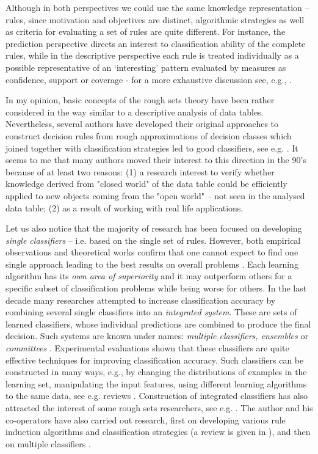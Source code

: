 \documentclass{llncs}
\begin{document}
Although in both perspectives we could use the same knowledge representation
-- rules, since motivation and objectives are distinct, algorithmic
strategies as well as criteria for evaluating a set of rules are quite
different. For instance, the prediction perspective directs an interest to
classification ability of the complete rules, while in the descriptive
perspective each rule is treated individually as a possible representative
of an `interesting' pattern evaluated by measures as confidence, support or
coverage - for a more exhaustive discussion see, e.g., \cite{st2}.

In my opinion, basic concepts of the rough sets theory have been rather
considered in the way similar to a descriptive analysis of data tables.
Nevertheless, several authors have developed their original approaches to
construct decision rules from rough approximations of decision classes which
joined together with classification strategies led to good
 classifiers, see e.g. \cite{bazan,lers,tutorial,Stef98,habcia}.
It seems to me that many authors moved their interest to this direction in
the 90's because of at least two reasons: (1) a research interest to verify
whether knowledge derived from "closed world" of the data table could be
efficiently applied to new objects coming from the "open world" -- not seen
in the analysed data table; (2) as a result of working with real life
applications.

Let us also notice that the majority of research has been focused on
developing {\em single classifiers} -- i.e. based on the single set of
rules. However, both empirical observations and theoretical works confirm
that one cannot expect to find one single approach leading to the best
results on overall problems \cite{Dietrich}. Each learning algorithm has its
{\em own area of superiority} and it may outperform others for a specific
subset of classification problems while being worse for others.  In the last
decade many researches attempted to increase classification accuracy by
combining several single classifiers into an {\em integrated system}. These
are sets of learned classifiers, whose individual predictions are combined
to produce the final decision. Such systems are known under names: {\em
multiple classifiers,  ensembles} or {\em committees}
\cite{Dietrich,Valentini}. Experimental evaluations shown that these
classifiers are quite effective techniques for improving classification
accuracy. Such classifiers can be constructed in many ways, e.g., by
changing the distributions of examples in the learning set, manipulating the
input features, using different learning algorithms to the same data, see
e.g. reviews \cite{Dietrich,Valentini,Stef01}. Construction of integrated
classifiers has also attracted the interest of some rough sets researchers,
see e.g. \cite{bazan04,gorawojna,nguyen05}.
 The author and his co-operators have also carried out research,
first on developing various rule induction algorithms and classification
strategies (a review is given in \cite{habcia}), and then on multiple
classifiers \cite{JelStef98,Stef01,Uppsala,StefKacz04,nowaczyk}.
\end{document}

